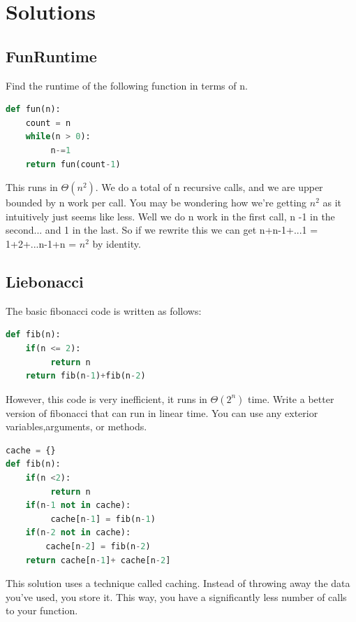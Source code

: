 \documentclass{article}
\begin{document}
\section{Solutions}
\subsection{FunRuntime}
Find the runtime of the following function in terms of n.
\begin{lstlisting}[language = Python]
def fun(n):
	count = n
	while(n > 0):
	     n-=1
	return fun(count-1)
\end{lstlisting}
\begin{solution}
This runs in $\Theta(n^{2})$. We do a total of n recursive calls, and we are upper bounded by n work per call. You may be wondering how we're getting $n^{2}$ as it intuitively just seems like less. Well we do n work in the first call, n -1 in the second... and 1 in the last. So if we rewrite this we can get n+n-1+...1 = 1+2+...n-1+n = $n^{2}$ by identity.
\end{solution}
\subsection{Liebonacci}
The basic fibonacci code is written as follows: 
\begin{lstlisting}[language = Python]
def fib(n):
	if(n <= 2):
	     return n
	return fib(n-1)+fib(n-2)
\end{lstlisting}
However, this code is very inefficient, it runs in $\Theta(2^{n})$ time. Write a better version of fibonacci that can run in linear time. You can use any exterior variables,arguments, or methods. 
\begin{solution}
\begin{lstlisting}[language = Python]
cache = {}
def fib(n):
    if(n <2):
         return n
    if(n-1 not in cache):
    	 cache[n-1] = fib(n-1)
    if(n-2 not in cache):
        cache[n-2] = fib(n-2)
    return cache[n-1]+ cache[n-2]
\end{lstlisting}
This solution uses a technique called caching. Instead of throwing away the data you've used, you store it. This way, you have a significantly less number of calls to your function.
\end{solution}
\end{document}

